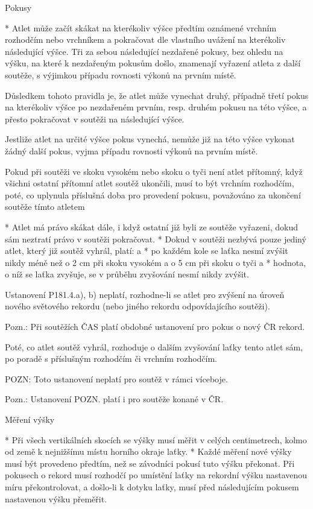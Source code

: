 Pokusy

* Atlet může začít skákat na kterékoliv výšce předtím oznámené vrchním rozhodčím nebo vrchníkem a pokračovat dle vlastního uvážení na kterékoliv následující výšce. Tři za sebou následující nezdařené pokusy, bez ohledu na výšku, na které k nezdařeným pokusům došlo, znamenají vyřazení atleta z další soutěže, s výjimkou případu rovnosti výkonů na prvním místě.

Důsledkem tohoto pravidla je, že atlet může vynechat druhý, případně třetí pokus na kterékoliv výšce po nezdařeném prvním, resp. druhém pokusu na této výšce, a přesto pokračovat v soutěži na následující výšce.

Jestliže atlet na určité výšce pokus vynechá, nemůže již na této výšce vykonat žádný další pokus, vyjma případu rovnosti výkonů na prvním místě.

Pokud při soutěži ve skoku vysokém nebo skoku o tyči není atlet přítomný, když všichni ostatní přítomní atlet soutěž ukončili, musí to být vrchním rozhodčím, poté, co uplynula příslušná doba pro provedení pokusu, považováno za ukončení soutěže tímto atletem

* Atlet má právo skákat dále, i když ostatní již byli ze soutěže vyřazeni, dokud sám neztratí právo v soutěži pokračovat.
* Dokud v soutěži nezbývá pouze jediný atlet, který již soutěž vyhrál, platí:
  \begitems \style a
  * po každém kole se laťka nesmí zvýšit nikdy méně než o 2 cm při skoku vysokém a o 5 cm při skoku o tyči a
  * hodnota, o níž se laťka zvyšuje, se v průběhu zvyšování nesmí nikdy zvýšit.
  \enditems

Ustanovení P181.4.a), b) neplatí, rozhodne-li se atlet pro zvýšení na úroveň nového světového rekordu (nebo jiného rekordu odpovídajícího soutěži).

Pozn.: Při soutěžích ČAS platí obdobné ustanovení pro pokus o nový ČR rekord.

Poté, co atlet soutěž vyhrál, rozhoduje o dalším zvyšování laťky tento atlet sám, po poradě s příslušným rozhodčím či vrchním rozhodčím.

POZN: Toto ustanovení neplatí pro soutěž v rámci víceboje.

Pozn.: Ustanovení POZN. platí i pro soutěže konané v ČR.

Měření výšky

* Při všech vertikálních skocích se výšky musí měřit v celých centimetrech, kolmo od země k nejnižšímu místu horního okraje laťky.
* Každé měření nové výšky musí být provedeno předtím, než se závodníci pokusí tuto výšku překonat. Při pokusech o rekord musí rozhodčí po umístění laťky na rekordní výšku nastavenou míru překontrolovat, a došlo-li k dotyku laťky, musí před následujícím pokusem nastavenou výšku přeměřit.

